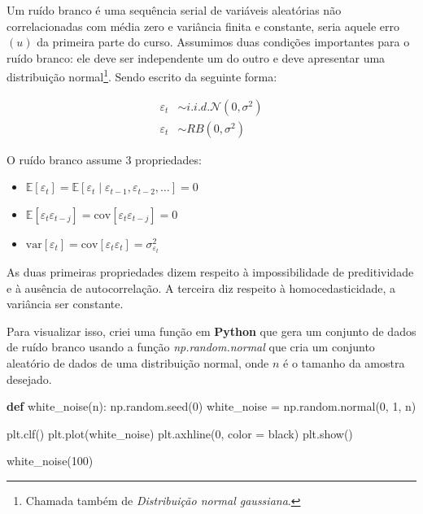 \documentclass[
  letterpaper,
  DIV=11,
  numbers=noendperiod]{scrreprt}
\newenvironment{Shaded}{\begin{snugshade}}{\end{snugshade}}
\newcommand{\DecValTok}[1]{\textcolor[rgb]{0.68,0.00,0.00}{#1}}
\newcommand{\KeywordTok}[1]{\textcolor[rgb]{0.00,0.23,0.31}{\textbf{#1}}}
\newcommand{\NormalTok}[1]{\textcolor[rgb]{0.00,0.23,0.31}{#1}}
\newcommand{\OperatorTok}[1]{\textcolor[rgb]{0.37,0.37,0.37}{#1}}
\newcommand{\StringTok}[1]{\textcolor[rgb]{0.13,0.47,0.30}{#1}}
\providecommand{\tightlist}{%
  \setlength{\itemsep}{0pt}\setlength{\parskip}{0pt}}\usepackage{longtable,booktabs,array}
\theoremstyle{definition}
\theoremstyle{plain}
\theoremstyle{remark}
\begin{document}
Um ruído branco é uma sequência serial de variáveis aleatórias não
correlacionadas com média zero e variância finita e constante, seria
aquele erro \((u)\) da primeira parte do curso. Assumimos duas condições
importantes para o ruído branco: ele deve ser independente um do outro e
deve apresentar uma distribuição normal\footnote{Chamada também de
  \emph{Distribuição normal gaussiana}.}. Sendo escrito da seguinte
forma:

\[
\begin{aligned}
\varepsilon_{t} &\sim i.i.d.\mathcal{N}(0, \sigma^2) \\
\varepsilon_{t} &\sim RB(0, \sigma^2)
\end{aligned}
\]

O ruído branco assume 3 propriedades:

\begin{itemize}
\tightlist
\item
  \(\mathbb{E}[\varepsilon_{t}] = \mathbb{E}[\varepsilon_{t} \mid \varepsilon_{t-1}, \varepsilon_{t-2}, \dotsc] = 0\)
\item
  \(\mathbb{E}[\varepsilon_{t} \varepsilon_{t-j}] = \text{cov}[\varepsilon_{t} \varepsilon_{t-j}] = 0\)
\item
  \(\text{var}[\varepsilon_{t}] = \text{cov}[\varepsilon_{t} \varepsilon_{t}] = \sigma^{2}_{\varepsilon_{t}}\)
\end{itemize}

As duas primeiras propriedades dizem respeito à impossibilidade de
preditividade e à ausência de autocorrelação. A terceira diz respeito à
homocedasticidade, a variância ser constante.

Para visualizar isso, criei uma função em \textbf{Python} que gera um
conjunto de dados de ruído branco usando a função
\emph{np.random.normal} que cria um conjunto aleatório de dados de uma
distribuição normal, onde \(n\) é o tamanho da amostra desejado.

\begin{Shaded}
\begin{Highlighting}[]
\KeywordTok{def}\NormalTok{ white\_noise(n):}
\NormalTok{    np.random.seed(}\DecValTok{0}\NormalTok{)}
\NormalTok{    white\_noise }\OperatorTok{=}\NormalTok{ np.random.normal(}\DecValTok{0}\NormalTok{, }\DecValTok{1}\NormalTok{, n)}
    
\NormalTok{    plt.clf()}
\NormalTok{    plt.plot(white\_noise)}
\NormalTok{    plt.axhline(}\DecValTok{0}\NormalTok{, color }\OperatorTok{=} \StringTok{\textquotesingle{}black\textquotesingle{}}\NormalTok{)}
\NormalTok{    plt.show()}
    
\NormalTok{white\_noise(}\DecValTok{100}\NormalTok{)}
\end{Highlighting}
\end{Shaded}
\end{document}
